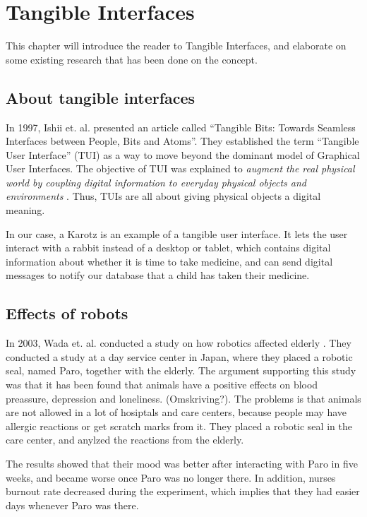 \chapter{Tangible Interfaces}
\label{chp:tangibleinterfaces}

This chapter will introduce the reader to Tangible Interfaces, and elaborate on some existing research that has been done on the concept.   

\section{About tangible interfaces}

In 1997, Ishii et. al. presented an article called ``Tangible Bits: Towards Seamless Interfaces between People, Bits and Atoms''. They established the term ``Tangible User Interface'' (TUI) as a way to move beyond the dominant model of Graphical User Interfaces. The objective of TUI was explained to \emph{augment the real physical world by coupling digital information to everyday physical objects and environments} \cite{ishii1997tangible}. Thus, TUIs are all about giving physical objects a digital meaning.   


In our case, a Karotz is an example of a tangible user interface. It lets the user interact with a rabbit instead of a desktop or tablet, which contains digital information about whether it is time to take medicine, and can send digital messages to notify our database that a child has taken their medicine.      


\section{Effects of robots}

In 2003, Wada et. al. conducted a study on how robotics affected elderly \cite{wada2004effects}. They conducted a study at a day service center in Japan, where they placed a robotic seal, named Paro, together with the elderly. The argument supporting this study was that it has been found that animals have a positive effects on blood preassure, depression and loneliness. (Omskriving?). The problems is that animals are not allowed in a lot of hosiptals and care centers, because people may have allergic reactions or get scratch marks from it. They placed a robotic seal in the care center, and anylzed the reactions from the elderly. 

The results showed that their mood was better after interacting with Paro in five weeks, and became worse once Paro was no longer there. In addition, nurses burnout rate decreased during the experiment, which implies that they had easier days whenever Paro was there.          

